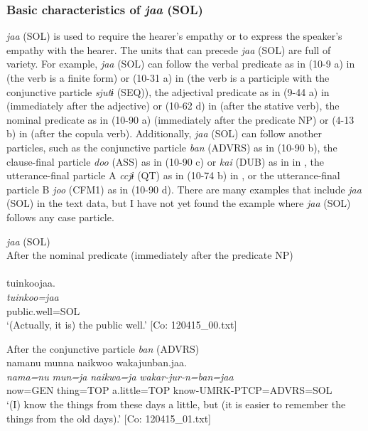 \begin{xlist}
\subsubsection{Basic characteristics of \textit{jaa} (SOL)}\label{sec:10.5.2.1}

\textit{jaa} (SOL) is used to require the hearer’s empathy or to express the speaker’s empathy with the hearer. The units that can precede \textit{jaa} (SOL) are full of variety. For example, \textit{jaa} (SOL) can follow the verbal predicate as in (10-9 a) in  (the verb is a finite form) or (10-31 a) in  (the verb is a participle with the conjunctive particle \textit{sjutɨ} (SEQ)), the adjectival predicate as in (9-44 a) in  (immediately after the adjective) or (10-62 d) in  (after the stative verb), the nominal predicate as in (10-90 a) (immediately after the predicate NP) or (4-13 b) in  (after the copula verb). Additionally, \textit{jaa} (SOL) can follow another particles, such as the conjunctive particle \textit{ban} (ADVRS) as in (10-90 b), the clause-final particle \textit{doo} (ASS) as in (10-90 c) or \textit{kai} (DUB) as in  in , the utterance-final particle A \textit{ccjɨ} (QT) as in (10-74 b) in , or the utterance-final particle B \textit{joo} (CFM1) as in (10-90 d). There are many examples that include \textit{jaa} (SOL) in the text data, but I have not yet found the example where \textit{jaa} (SOL) follows any case particle.

\ea\label{ex:10.90}   \textit{jaa} (SOL)\\
  \ea After the nominal predicate (immediately after the predicate NP)\\\\
      \glll    tuinkoojaa.\\
    \textit{tuinkoo=jaa}\\
    public.well=SOL\\
  \glt     ‘(Actually, it is) the public well.’ [Co: 120415\_00.txt]

  \ex After the conjunctive particle \textit{ban} (ADVRS)\\
      \glll    namanu  munna  naikwoo  wakajunban.jaa.\\
    \textit{nama=nu}  \textit{mun=ja}  \textit{naikwa=ja}  \textit{wakar-jur-n=ban=jaa}\\
    now=GEN  thing=TOP  a.little=TOP  know-UMRK-PTCP=ADVRS=SOL\\
  \glt     ‘(I) know the things from these days a little, but (it is easier to remember the things from the old days).’ [Co: 120415\_01.txt]


\end{xlist}
